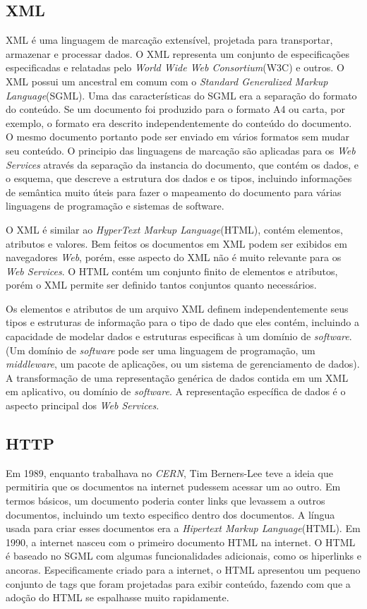 \documentclass{acm_proc_article-sp}
\begin{document}
	\subsection{XML}
		XML é uma linguagem de marcação extensível, projetada para transportar, armazenar e processar dados. O XML representa um conjunto de especificações especificadas e relatadas pelo \emph{World Wide Web Consortium}(W3C) e outros. O XML possui um ancestral em comum com o \emph{Standard Generalized Markup Language}(SGML). Uma das características do SGML era a separação do formato do conteúdo. Se um documento foi produzido para o formato A4 ou carta, por exemplo, o formato era descrito independentemente do conteúdo do documento. O mesmo documento portanto pode ser enviado em vários formatos sem mudar seu conteúdo. O principio das linguagens de marcação são aplicadas para os \emph{Web Services} através da separação da instancia do documento, que contém os dados, e o esquema, que descreve a estrutura dos dados e os tipos, incluindo informações de semântica muito úteis para fazer o mapeamento do documento para várias linguagens de programação e sistemas de software.
		
		O XML é similar ao \emph{HyperText Markup Language}(HTML), contém elementos, atributos e valores. Bem feitos os documentos em XML podem ser exibidos em navegadores \emph{Web}, porém, esse aspecto do XML não é muito relevante para os \emph{Web Services}. O HTML contém um conjunto finito de elementos e atributos, porém o XML permite ser definido tantos conjuntos quanto necessários.
		
		Os elementos e atributos de um arquivo XML definem independentemente seus tipos e estruturas de informação para o tipo de dado que eles contém, incluindo a capacidade de modelar dados e estruturas especificas à um domínio de \emph{software}. (Um domínio de \emph{software} pode ser uma linguagem de programação, um \emph{middleware}, um pacote de aplicações, ou um sistema de gerenciamento de dados). A transformação de uma representação genérica de dados contida em um XML em aplicativo, ou domínio de \emph{software}. A representação específica de dados é o aspecto principal dos \emph{Web Services}.
		
		
		

		
	\subsection{HTTP}
		Em 1989, enquanto trabalhava no \emph{CERN}, Tim Berners-Lee teve a ideia que permitiria que os documentos na 
		internet pudessem acessar um ao outro. Em termos básicos, um documento poderia conter links que
		levassem a outros documentos, incluindo um texto especifico dentro dos documentos. A língua usada
		para criar esses documentos era a \emph{Hipertext Markup Language}(HTML). Em 1990, a internet nasceu com
		o primeiro documento HTML na internet. O HTML é baseado no SGML com algumas funcionalidades adicionais, como os hiperlinks
		e ancoras. Especificamente criado para a internet, o HTML apresentou um pequeno conjunto de tags que foram projetadas
		para exibir conteúdo, fazendo com que a adoção do HTML se espalhasse muito rapidamente.\cite{PRO_PHPXML}
	
\end{document}
